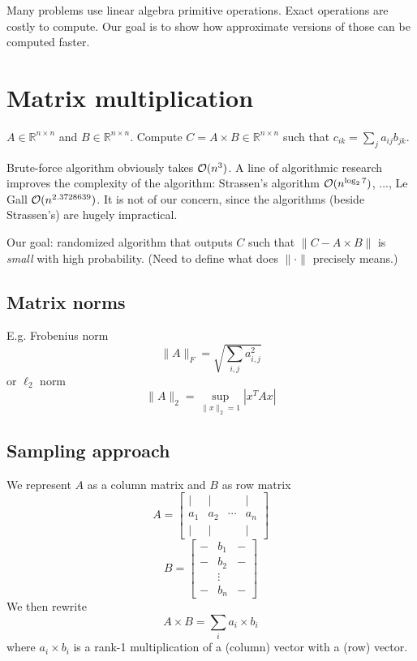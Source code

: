 \documentclass[11pt]{article}
\begin{document}

Many problems use linear algebra primitive operations. Exact  operations are costly to compute. Our goal is to show how approximate versions of those can be computed faster. 

\section{Matrix multiplication \cite{DBLP:conf/issac/Gall14a}}
$A \in \mathbb{R}^{n \times n}$ and $B \in \mathbb{R}^{n \times n}$. Compute $C  = A \times B\in \mathbb{R}^{n \times n}$ such that $c_{ik} = \sum_j a_{ij}b_{jk}$.

Brute-force algorithm obviously takes $\mathcal{O}(n^3)$. A line of algorithmic research improves the complexity of the algorithm: Strassen's algorithm $\mathcal{O}(n^{\log_2 7})$, ..., Le Gall $\mathcal{O}(n^{2.3728639})$. It is not of our concern, since the algorithms (beside Strassen's) are hugely impractical. 

Our goal: randomized algorithm that outputs $C$ such that $\|C - A \times B\|$ is \emph{small} with high probability. (Need to define what does $\|\cdot\|$ precisely means.)

\subsection{Matrix norms}
E.g. Frobenius norm
$$\|A\|_F = \sqrt{ \sum_{i,j} a_{i,j}^2 }$$
or $\ell_2$ norm
$$\|A\|_2 = \sup_{\|x\|_2=1} |x^T A x|$$

\subsection{Sampling approach \cite{doi:10.1137/S0097539704442684}}
We represent $A$ as a column matrix and $B$ as row matrix 
$$A = \begin{bmatrix} | & | & & | \\ a_1& a_2& \cdots& a_n\\ | & | & & |  \end{bmatrix}$$
$$B = \begin{bmatrix} - & b_1 & -\\ - & b_2 & -\\ & \vdots & \\ - & b_n & - \end{bmatrix}$$
We then rewrite
$$A \times B = \sum_i a_i \times b_i$$
where $a_i \times b_i$ is a rank-1 multiplication of a (column) vector with a (row) vector.
\end{document}

